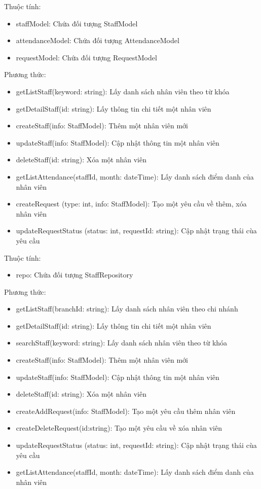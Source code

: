 Thuộc tính:
\begin{itemize}
	\item staffModel: Chứa đối tượng StaffModel
	\item attendanceModel: Chứa đối tượng AttendanceModel
	\item requestModel: Chứa đối tượng RequestModel
\end{itemize}
Phương thức:
\begin{itemize}
	\item getListStaff(keyword: string): Lấy danh sách nhân viên theo từ khóa
	\item getDetailStaff(id: string): Lấy thông tin chi tiết một nhân viên
	\item createStaff(info: StaffModel): Thêm một nhân viên mới
	\item updateStaff(info: StaffModel): Cập nhật thông tin một nhân viên
	\item deleteStaff(id: string): Xóa một nhân viên
	\item getListAttendance(staffId, month: dateTime): Lấy danh sách điểm danh của nhân viên
	\item createRequest (type: int, info: StaffModel): Tạo một yêu cầu về thêm, xóa nhân viên
	\item updateRequestStatus (status: int, requestId: string): Cập nhật trạng thái cùa yêu cầu
\end{itemize}

Thuộc tính:
\begin{itemize}
	\item repo: Chứa đối tượng StaffRepository
\end{itemize}
Phương thức:
\begin{itemize}
	\item getListStaff(branchId: string): Lấy danh sách nhân viên theo chi nhánh
	\item getDetailStaff(id: string): Lấy thông tin chi tiết một nhân viên
	\item searchStaff(keyword: string): Lấy danh sách nhân viên theo từ khóa
	\item createStaff(info: StaffModel): Thêm một nhân viên mới
	\item updateStaff(info: StaffModel): Cập nhật thông tin một nhân viên
	\item deleteStaff(id: string): Xóa một nhân viên
	\item createAddRequest(info: StaffModel): Tạo một yêu cầu thêm nhân viên
	\item createDeleteRequest(id:string): Tạo một yêu cầu về xóa nhân viên
	\item updateRequestStatus (status: int, requestId: string): Cập nhật trạng thái cùa yêu cầu
	\item getListAttendance(staffId, month: dateTime): Lấy danh sách điểm danh của nhân viên
\end{itemize}

